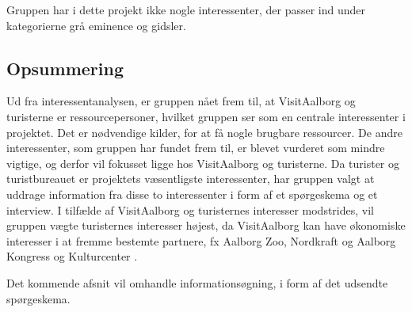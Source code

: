 Gruppen har i dette projekt ikke nogle interessenter, der passer ind under kategorierne grå eminence og gidsler.

\subsection{Opsummering}
Ud fra interessentanalysen, er gruppen nået frem til, at VisitAalborg og turisterne er ressourcepersoner, hvilket gruppen ser som en centrale interessenter i projektet. Det er nødvendige kilder, for at få nogle brugbare ressourcer.
De andre interessenter, som gruppen har fundet frem til, er blevet vurderet som mindre vigtige, og derfor vil fokusset ligge hos VisitAalborg og turisterne.
Da turister og turistbureauet er projektets væsentligste interessenter, har gruppen valgt at uddrage information fra disse to interessenter i form af et spørgeskema og et interview. 
I tilfælde af VisitAalborg og turisternes interesser modstrides, vil gruppen vægte turisternes interesser højest, da VisitAalborg kan have økonomiske interesser i at fremme bestemte partnere, fx Aalborg Zoo, Nordkraft og Aalborg Kongress og Kulturcenter \citep{VA}. 

Det kommende afsnit vil omhandle informationsøgning, i form af det udsendte spørgeskema. 


